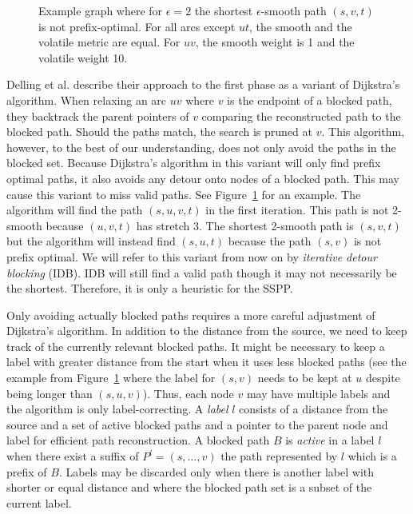 \documentclass[a4paper,UKenglish,cleveref, autoref, thm-restate]{lipics-v2021}
\begin{document}
\begin{figure}
\centering
{}
\caption{Example graph where for $\epsilon = 2$ the shortest $\epsilon$-smooth path $(s,v,t)$ is not prefix-optimal. For all arcs except $ut$, the smooth and the volatile metric are equal. For $uv$, the smooth weight is 1 and the volatile weight 10.}
\label{fig:ipb_counterexample}
\end{figure}

Delling et al. describe their approach to the first phase as a variant of Dijkstra's algorithm.
When relaxing an arc $uv$ where $v$ is the endpoint of a blocked path, they backtrack the parent pointers of $v$ comparing the reconstructed path to the blocked path.
Should the paths match, the search is pruned at $v$.
This algorithm, however, to the best of our understanding, does not only avoid the paths in the blocked set.
Because Dijkstra's algorithm in this variant will only find prefix optimal paths, it also avoids any detour onto nodes of a blocked path.
This may cause this variant to miss valid paths.
See Figure~\ref{fig:ipb_counterexample} for an example.
The algorithm will find the path $(s,u,v,t)$ in the first iteration.
This path is not 2-smooth because $(u,v,t)$ has stretch 3.
The shortest 2-smooth path is $(s,v,t)$ but the algorithm will instead find $(s,u,t)$ because the path $(s,v)$ is not prefix optimal.
We will refer to this variant from now on by \emph{iterative detour blocking} (IDB).
IDB will still find a valid path though it may not necessarily be the shortest.
Therefore, it is only a heuristic for the SSPP.

Only avoiding actually blocked paths requires a more careful adjustment of Dijkstra's algorithm.
In addition to the distance from the source, we need to keep track of the currently relevant blocked paths.
It might be necessary to keep a label with greater distance from the start when it uses less blocked paths (see the example from Figure~\ref{fig:ipb_counterexample} where the label for $(s,v)$ needs to be kept at $u$ despite being longer than $(s,u,v)$).
Thus, each node $v$ may have multiple labels and the algorithm is only label-correcting.
A \emph{label} $l$ consists of a distance from the source and a set of active blocked paths and a pointer to the parent node and label for efficient path reconstruction.
A blocked path $B$ is \emph{active} in a label $l$ when there exist a suffix of $P^l = (s,\dots,v)$ the path represented by $l$ which is a prefix of $B$.
Labels may be discarded only when there is another label with shorter or equal distance and where the blocked path set is a subset of the current label.
\end{document}

